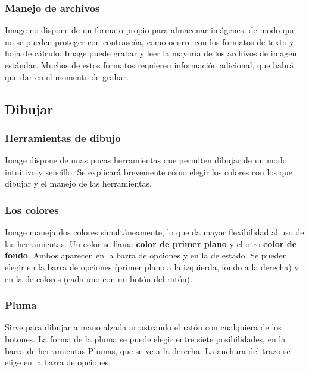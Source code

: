 
\subsubsection{Manejo de archivos}
Image no dispone de un formato propio para almacenar imágenes, de modo que no se pueden proteger con 
contraseña, como ocurre con los formatos de texto y hoja de cálculo.
Image puede grabar y leer la mayoría de los archivos de imagen estándar. Muchos de estos formatos requieren 
información adicional, que habrá que dar en el momento de grabar.


\subsection{Dibujar}
\subsubsection{Herramientas de dibujo}
Image dispone de unas pocas herramientas que permiten dibujar de un modo intuitivo y sencillo. Se explicará 
brevemente cómo elegir los colores con los que dibujar y el manejo de las herramientas.

\subsubsection{Los colores}
Image maneja dos colores simultáneamente, lo que da mayor flexibilidad al uso de las herramientas. Un color 
se llama \textbf{color de primer plano} y el otro \textbf{color de fondo}. Ambos aparecen en la barra de opciones y en la de estado. Se pueden elegir en la barra de opciones (primer plano a la izquierda, fondo a la derecha) y en la de colores (cada uno con un botón del ratón).

\subsubsection{Pluma}
Sirve para dibujar a mano alzada arrastrando el ratón con cualquiera de los botones. La forma de la pluma 
se puede elegir entre siete posibilidades, en la barra de herramientas Plumas, que se ve a la derecha. La 
anchura del trazo se elige en la barra de opciones.

